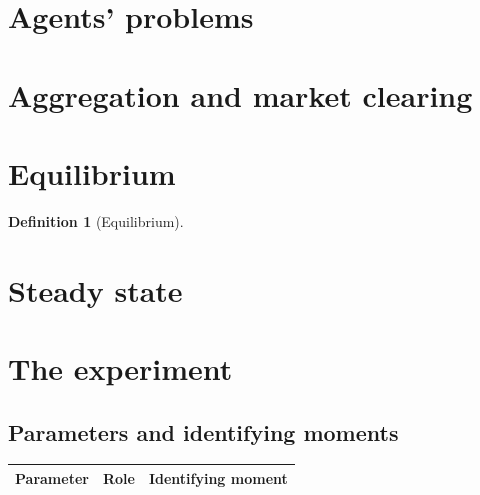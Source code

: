 \documentclass[12pt]{article}
\newtheorem{definition}{Definition}
\theoremstyle{remark}
\begin{document}
\section{Agents' problems}

\section{Aggregation and market clearing}

\section{Equilibrium}
\begin{definition}[Equilibrium]
\end{definition}

\section{Steady state}

\section{The experiment}

\subsection*{Parameters and identifying moments}
\begin{center}
\begin{tabular}{lll}
\toprule
Parameter & Role & Identifying moment \\
\midrule
\bottomrule
\end{tabular}
\end{center}
\end{document}
